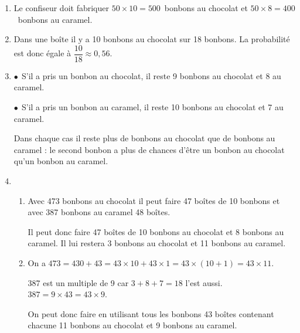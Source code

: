 
\medskip

%

\begin{enumerate}
\item %
Le confiseur doit fabriquer $50\times 10 = 500$~bonbons au chocolat et $50 \times 8 = 400$~bonbons au caramel.
\item %
Dans une boîte il y a 10 bonbons au chocolat sur 18 bonbons. La probabilité est donc égale à $\dfrac{10}{18} \approx 0,56$.
\item %
$\bullet~~$S'il a pris un bonbon au chocolat, il reste 9 bonbons au chocolat et 8 au caramel.

$\bullet~~$S'il a pris un bonbon au caramel, il reste 10 bonbons au chocolat et 7 au caramel.

Dans chaque cas il reste plus de bonbons au chocolat que de bonbons au caramel : le second bonbon a plus de chances d'être un bonbon au chocolat qu'un bonbon au caramel.
\item %
	\begin{enumerate}
		\item %
Avec 473 bonbons au chocolat il peut faire 47 boîtes de 10 bonbons et avec 387 bonbons au caramel 48 boîtes.

Il peut donc faire 47 boîtes de 10 bonbons au chocolat et 8 bonbons au caramel. Il lui restera 3 bonbons au chocolat et 11 bonbons au caramel.
		\item %
On a $473 = 430 + 43 = 43\times 10 + 43\times 1 = 43 \times (10 + 1) = 43 \times 11$.

387 est un multiple de 9 car $3 + 8 + 7 = 18$ l'est aussi. $387 = 9 \times 43 = 43 \times 9$.

On peut donc faire en utilisant tous les bonbons 43 boîtes contenant chacune 11 bonbons au chocolat et 9 bonbons au caramel.
	\end{enumerate}
\end{enumerate}

\vspace{0,5cm}

